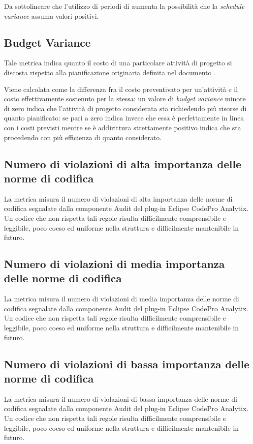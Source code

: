 Da sottolineare che l'utilizzo di periodi di  aumenta la possibilità che la \emph{schedule variance} assuma valori positivi.



\subsection{Budget Variance}
Tale metrica indica quanto il costo di una particolare attività di progetto si discosta rispetto alla pianificazione originaria definita nel documento \PdP. 

Viene calcolata come la differenza fra il costo preventivato per un'attività e il costo effettivamente sostenuto per la stessa: un valore di \emph{budget variance} minore di zero indica che l'attività di progetto considerata sta richiedendo più risorse di quanto pianificato: se pari a zero indica invece che essa è perfettamente in linea con i costi previsti mentre se è addirittura strettamente positivo indica che sta procedendo con più efficienza di quanto considerato.



\subsection{Numero di violazioni di alta importanza delle norme di codifica}
La metrica misura il numero di violazioni di alta importanza delle norme di codifica segnalate dalla componente Audit del plug-in Eclipse CodePro Analytix. Un codice che non rispetta tali regole risulta difficilmente comprensibile e leggibile, poco coeso ed uniforme nella struttura e difficilmente mantenibile in futuro.



\subsection{Numero di violazioni di media importanza delle norme di codifica}
La metrica misura il numero di violazioni di media importanza delle norme di codifica segnalate dalla componente Audit del plug-in Eclipse CodePro Analytix. Un codice che non rispetta tali regole risulta difficilmente comprensibile e leggibile, poco coeso ed uniforme nella struttura e difficilmente mantenibile in futuro.



\subsection{Numero di violazioni di bassa importanza delle norme di codifica}
La metrica misura il numero di violazioni di bassa importanza delle norme di codifica segnalate dalla componente Audit del plug-in Eclipse CodePro Analytix. Un codice che non rispetta tali regole risulta difficilmente comprensibile e leggibile, poco coeso ed uniforme nella struttura e difficilmente mantenibile in futuro.



